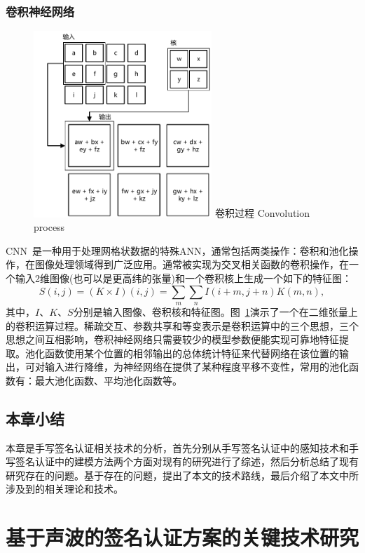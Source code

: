 \subsection{卷积神经网络}
\begin{figure}[!htp]
  \centering
  \includegraphics[width=0.6\textwidth]{figure/convolution-process.pdf}
  \bicaption
    {卷积过程}
    {Convolution process}
  \label{fig:convolution-process}
\end{figure}
CNN~\cite{goodfellow2016deep}是一种用于处理网格状数据的特殊ANN，通常包括两类操作：卷积和池化操作，在图像处理领域得到广泛应用。通常被实现为交叉相关函数的卷积操作，在一个输入2维图像(也可以是更高纬的张量)和一个卷积核上生成一个如下的特征图：
$$
S(i,j)=(K\times I)(i,j)=\sum_{m}\sum_{n}I(i+m,j+n)K(m,n),
$$
其中，$I$、$K$、$S$分别是输入图像、卷积核和特征图。图~\ref{fig:convolution-process}演示了一个在二维张量上的卷积运算过程。稀疏交互、参数共享和等变表示是卷积运算中的三个思想，三个思想之间互相影响，卷积神经网络只需要较少的模型参数便能实现可靠地特征提取。池化函数使用某个位置的相邻输出的总体统计特征来代替网络在该位置的输出，可对输入进行降维，为神经网络在提供了某种程度平移不变性，常用的池化函数有：最大池化函数、平均池化函数等。


\section{本章小结}
本章是手写签名认证相关技术的分析，首先分别从手写签名认证中的感知技术和手写签名认证中的建模方法两个方面对现有的研究进行了综述，然后分析总结了现有研究存在的问题。基于存在的问题，提出了本文的技术路线，最后介绍了本文中所涉及到的相关理论和技术。

\chapter{基于声波的签名认证方案的关键技术研究}
